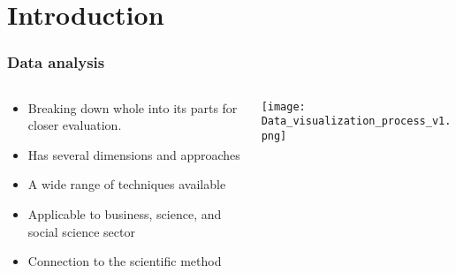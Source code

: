 \section{Introduction}
\SectionPage

\begin{frame}
    \frametitle{Data analysis}
    \vspace*{\fill}

    \begin{columns}[onlytextwidth, c]
        \begin{column}{0.495\textwidth}
            \begin{itemize}[<+-|alert@+>]
                \item Breaking down whole into its parts for closer evaluation.
                \item Has several dimensions and approaches 
                \item A wide range of techniques available %
                \item Applicable to business, science, and social science sector
                \item Connection to the scientific method
            \end{itemize}
        \end{column}
        \begin{column}{0.495\textwidth}
            \texttt{[image: Data\_visualization\_process\_v1.png]}
        \end{column}
    \end{columns}
    \vspace*{\fill}
\end{frame}

